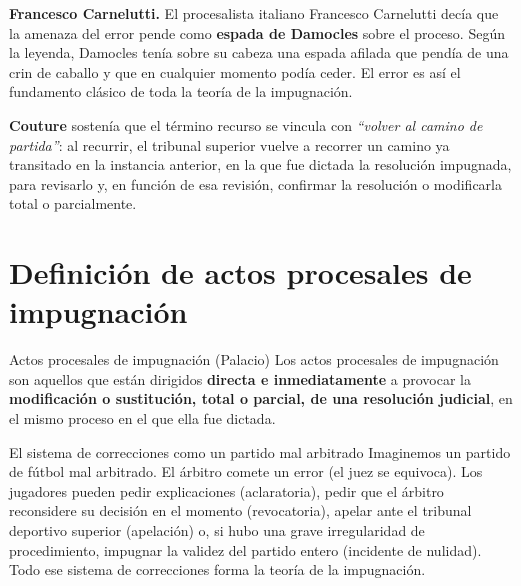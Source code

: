 \documentclass[12pt,oneside]{book}
\begin{document}
\begin{note}
\textbf{Francesco Carnelutti.} El procesalista italiano Francesco Carnelutti decía que la amenaza del error pende como \textbf{espada de Damocles} sobre el proceso. Según la leyenda, Damocles tenía sobre su cabeza una espada afilada que pendía de una crin de caballo y que en cualquier momento podía ceder. El error es así el fundamento clásico de toda la teoría de la impugnación.
\end{note}

\textbf{Couture} sostenía que el término recurso se vincula con \textit{``volver al camino de partida''}: al recurrir, el tribunal superior vuelve a recorrer un camino ya transitado en la instancia anterior, en la que fue dictada la resolución impugnada, para revisarlo y, en función de esa revisión, confirmar la resolución o modificarla total o parcialmente.

\section{Definición de actos procesales de impugnación}

\begin{definition}{Actos procesales de impugnación (Palacio)}
Los actos procesales de impugnación son aquellos que están dirigidos \textbf{directa e inmediatamente} a provocar la \textbf{modificación o sustitución, total o parcial, de una resolución judicial}, en el mismo proceso en el que ella fue dictada.
\end{definition}

\begin{example}{El sistema de correcciones como un partido mal arbitrado}
Imaginemos un partido de fútbol mal arbitrado. El árbitro comete un error (el juez se equivoca). Los jugadores pueden pedir explicaciones (aclaratoria), pedir que el árbitro reconsidere su decisión en el momento (revocatoria), apelar ante el tribunal deportivo superior (apelación) o, si hubo una grave irregularidad de procedimiento, impugnar la validez del partido entero (incidente de nulidad). Todo ese sistema de correcciones forma la teoría de la impugnación.
\end{example}
\end{document}
